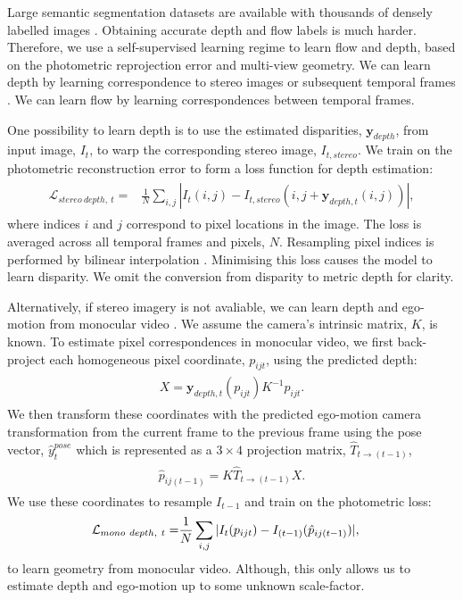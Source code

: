 Large semantic segmentation datasets are available with thousands of densely labelled images \citep{lin2014microsoft,Cordts2016Cityscapes}.
Obtaining accurate depth and flow labels is much harder. Therefore, we use a self-supervised learning regime to learn flow and depth, based on the photometric reprojection error and multi-view geometry. We can learn depth by learning correspondence to stereo images \citep{garg2016unsupervised} or subsequent temporal frames \citep{zhou2017unsupervised}. We can learn flow by learning correspondences between temporal frames.

One possibility to learn depth is to use the estimated disparities, $\mathbf{y}_{depth}$, from input image, $I_t$, to warp the corresponding stereo image, $I_{t,stereo}$. We train on the photometric reconstruction error to form a loss function for depth estimation:
\begin{align}
\begin{split}
\mathcal{L}_{stereo~depth,~t} =& \frac{1}{N} \sum_{i,j} | I_t(i,j) - I_{t,stereo}(i,j+\mathbf{y}_{depth,t}(i,j)) |,
\end{split}
\label{eqn:depth}
\end{align}
where indices $i$ and $j$ correspond to pixel locations in the image. The loss is averaged across all temporal frames and pixels, $N$. Resampling pixel indices is performed by bilinear interpolation \citep{jaderberg2015spatial}. Minimising this loss causes the model to learn disparity. We omit the conversion from disparity to metric depth for clarity.

Alternatively, if stereo imagery is not avaliable, we can learn depth and ego-motion from monocular video \citep{zhou2017unsupervised}. We assume the camera's intrinsic matrix, $K$, is known. To estimate pixel correspondences in monocular video, we first back-project each homogeneous pixel coordinate, $p_{ijt}$, using the predicted depth:
\begin{align}
\begin{split}
X =  \mathbf{y}_{depth,t}(p_{ijt}) K^{-1} p_{ijt}.
\end{split}
\end{align}
We then transform these coordinates with the predicted ego-motion camera transformation from the current frame to the previous frame using the pose vector, $\hat{y}_t^{pose}$ which is represented as a $3\times4$ projection matrix, $\hat{T}_{t \to (t-1)}$,
\begin{align}
\begin{split}
\hat{p}_{ij(t-1)} = K \hat{T}_{t \to (t-1)} X.
\end{split}
\end{align}
We use these coordinates to resample $I_{t-1}$ and train on the photometric loss:
\begin{align}
\vspace{-1mm}
\begin{split}
\mathcal{L}_{mono~depth,~t} =& \frac{1}{N} \sum_{i,j} | I_t(p_{ijt}) - I_{(t-1)}(\hat{p}_{ij(t-1)}) |,
\end{split}
\label{eqn:monodepth}
\end{align}
to learn geometry from monocular video. Although, this only allows us to estimate depth and ego-motion up to some unknown scale-factor.

